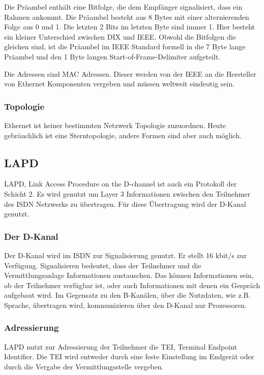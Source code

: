\documentclass[12pt, a4paper, ngerman]{article}
\begin{document}
Die Präambel enthält eine Bitfolge, die dem Empfänger signalisiert, dass ein Rahmen ankommt. Die Präambel besteht aus 8 Bytes mit einer alternierenden Folge aus 0 und 1. Die letzten 2 Bits im letzten Byte sind immer 1. Hier besteht ein kleiner Unterschied zwischen DIX und IEEE. Obwohl die Bitfolgen die gleichen sind, ist die Präambel im IEEE Standard formell in die 7 Byte lange Präambel und den 1 Byte langen Start-of-Frame-Delimiter aufgeteilt.
 
Die Adressen sind MAC Adressen. Dieser werden von der IEEE an die Hersteller von Ethernet Komponenten vergeben und müssen weltweit eindeutig sein.

\subsubsection{Topologie}
Ethernet ist keiner bestimmten Netzwerk Topologie zuzuordnen. Heute gebräuchlich ist eine Sterntopologie, andere Formen sind aber auch möglich.   

\subsection{LAPD}
LAPD, Link Access Procedure on the D-channel ist auch ein Protokoll der Schicht 2. Es wird genutzt um Layer 3 Informationen zwischen den Teilnehmer des ISDN Netzwerks zu übertragen. Für diese Übertragung wird der D-Kanal genutzt.

\subsubsection{Der D-Kanal}
Der D-Kanal wird im ISDN zur Signalisierung genutzt. Er stellt 16 kbit/s zur Verfügung. Signalisieren bedeutet, dass der Teilnehmer und die Vermittlungsanlage Informationen austauschen. Das können Informationen sein, ob der Teilnehmer verfügbar ist, oder auch Informationen mit denen ein Gespräch aufgebaut wird. Im Gegensatz zu den B-Kanälen, über die Nutzdaten, wie z.B. Sprache, übertragen wird, kommunizieren über den D-Kanal nur Prozessoren.

\subsubsection{Adressierung}
LAPD nutzt zur Adressierung der Teilnehmer die TEI, Terminal Endpoint Identifier. Die TEI wird entweder durch eine feste Einstellung im Endgerät oder durch die Vergabe der Vermittlungsstelle vergeben.
\end{document}
